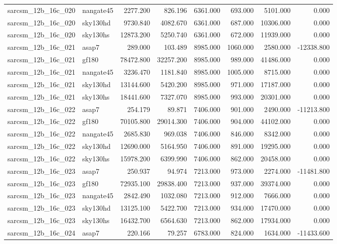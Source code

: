 \begin{tabular}{llrrrrrr}
sarcsm\_12b\_16c\_020 & nangate45 & 2277.200 & 826.196 & 6361.000 & 693.000 & 5101.000 & 0.000 \\
sarcsm\_12b\_16c\_020 & sky130hd & 9730.840 & 4082.670 & 6361.000 & 687.000 & 10306.000 & 0.000 \\
sarcsm\_12b\_16c\_020 & sky130hs & 12873.200 & 5250.740 & 6361.000 & 672.000 & 11939.000 & 0.000 \\
sarcsm\_12b\_16c\_021 & asap7 & 289.000 & 103.489 & 8985.000 & 1060.000 & 2580.000 & -12338.800 \\
sarcsm\_12b\_16c\_021 & gf180 & 78472.800 & 32257.200 & 8985.000 & 989.000 & 41486.000 & 0.000 \\
sarcsm\_12b\_16c\_021 & nangate45 & 3236.470 & 1181.840 & 8985.000 & 1005.000 & 8715.000 & 0.000 \\
sarcsm\_12b\_16c\_021 & sky130hd & 13144.600 & 5420.200 & 8985.000 & 971.000 & 17187.000 & 0.000 \\
sarcsm\_12b\_16c\_021 & sky130hs & 18441.600 & 7327.070 & 8985.000 & 993.000 & 20301.000 & 0.000 \\
sarcsm\_12b\_16c\_022 & asap7 & 254.179 & 89.871 & 7406.000 & 901.000 & 2490.000 & -11213.800 \\
sarcsm\_12b\_16c\_022 & gf180 & 70105.800 & 29014.300 & 7406.000 & 904.000 & 44102.000 & 0.000 \\
sarcsm\_12b\_16c\_022 & nangate45 & 2685.830 & 969.038 & 7406.000 & 846.000 & 8342.000 & 0.000 \\
sarcsm\_12b\_16c\_022 & sky130hd & 12690.000 & 5164.950 & 7406.000 & 891.000 & 19295.000 & 0.000 \\
sarcsm\_12b\_16c\_022 & sky130hs & 15978.200 & 6399.990 & 7406.000 & 862.000 & 20458.000 & 0.000 \\
sarcsm\_12b\_16c\_023 & asap7 & 250.937 & 94.974 & 7213.000 & 973.000 & 2274.000 & -11481.800 \\
sarcsm\_12b\_16c\_023 & gf180 & 72935.100 & 29838.400 & 7213.000 & 937.000 & 39374.000 & 0.000 \\
sarcsm\_12b\_16c\_023 & nangate45 & 2842.490 & 1032.080 & 7213.000 & 912.000 & 7666.000 & 0.000 \\
sarcsm\_12b\_16c\_023 & sky130hd & 13125.100 & 5422.700 & 7213.000 & 934.000 & 17470.000 & 0.000 \\
sarcsm\_12b\_16c\_023 & sky130hs & 16432.700 & 6564.630 & 7213.000 & 862.000 & 17934.000 & 0.000 \\
sarcsm\_12b\_16c\_024 & asap7 & 220.166 & 79.257 & 6783.000 & 824.000 & 1634.000 & -11433.600 \\

\end{tabular}
